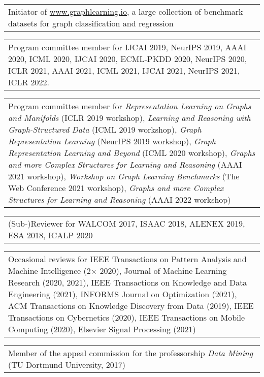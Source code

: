 \documentclass[11pt, a4paper, DIV=12]{scrartcl}
\begin{document}
\begin{tabular}{p{14.5cm}}
Initiator of \url{www.graphlearning.io}, a large collection of benchmark datasets for graph classification and regression\\[0.5em]
\end{tabular}

\begin{tabular}{p{14.5cm}}	
Program committee member for IJCAI 2019, NeurIPS  2019, AAAI 2020, ICML 2020, IJCAI 2020, ECML-PKDD 2020, NeurIPS 2020, ICLR 2021, AAAI 2021, ICML 2021, IJCAI 2021,  NeurIPS 2021, ICLR 2022. \\[0.5em]
\end{tabular}

\begin{tabular}{p{14.5cm}}
Program committee member for \emph{Representation Learning on Graphs and Manifolds} (ICLR 2019 workshop), \emph{Learning and Reasoning with Graph-Structured Data} (ICML 2019 workshop), \emph{Graph Representation Learning} (NeurIPS 2019 workshop), \emph{Graph Representation Learning and Beyond} (ICML 2020 workshop), \emph{Graphs and more Complex Structures for Learning and Reasoning} (AAAI 2021 workshop), \emph{Workshop on Graph Learning Benchmarks} (The Web Conference 2021 workshop),  \emph{Graphs and more Complex Structures for Learning and Reasoning} (AAAI 2022 workshop)\\[0.5em]
\end{tabular}

\begin{tabular}{p{14.5cm}}
(Sub-)Reviewer for WALCOM 2017, ISAAC 2018, ALENEX 2019, ESA 2018, ICALP 2020 \\[0.5em]
\end{tabular}

\begin{tabular}{p{14.5cm}}
Occasional reviews for IEEE Transactions on Pattern Analysis and Machine Intelligence (2$\times$ 2020), Journal of Machine Learning Research (2020, 2021), IEEE Transactions on Knowledge and Data Engineering (2021), INFORMS Journal on Optimization (2021), ACM Transactions on Knowledge Discovery from Data (2019), IEEE Transactions on Cybernetics (2020), IEEE Transactions on Mobile Computing (2020), Elsevier Signal Processing (2021)\\[0.5em]
\end{tabular}

\begin{tabular}{p{14.5cm}}
Member of the appeal commission for the professorship \emph{Data Mining} (TU Dortmund University, 2017)
\end{tabular}
\end{document}
